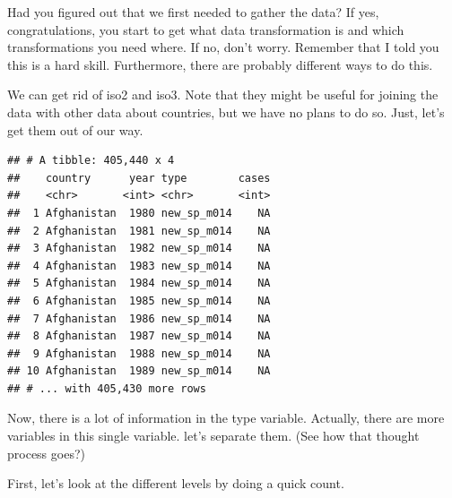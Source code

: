 \documentclass[]{tufte-book}
\newenvironment{Shaded}{}{}
\newcommand{\CommentTok}[1]{\textcolor[rgb]{0.38,0.63,0.69}{\textit{#1}}}
\newcommand{\DataTypeTok}[1]{\textcolor[rgb]{0.56,0.13,0.00}{#1}}
\newcommand{\KeywordTok}[1]{\textcolor[rgb]{0.00,0.44,0.13}{\textbf{#1}}}
\newcommand{\NormalTok}[1]{#1}
\newcommand{\OperatorTok}[1]{\textcolor[rgb]{0.40,0.40,0.40}{#1}}
\newcommand{\OtherTok}[1]{\textcolor[rgb]{0.00,0.44,0.13}{#1}}
\newcommand{\StringTok}[1]{\textcolor[rgb]{0.25,0.44,0.63}{#1}}
\begin{document}
Had you figured out that we first needed to gather the data? If yes, congratulations, you start to get what data transformation is and which transformations you need where. If no, don't worry. Remember that I told you this is a hard skill. Furthermore, there are probably different ways to do this.

We can get rid of iso2 and iso3. Note that they might be useful for joining the data with other data about countries, but we have no plans to do so. Just, let's get them out of our way.

\begin{Shaded}
\end{Shaded}

\begin{verbatim}
## # A tibble: 405,440 x 4
##    country      year type        cases
##    <chr>       <int> <chr>       <int>
##  1 Afghanistan  1980 new_sp_m014    NA
##  2 Afghanistan  1981 new_sp_m014    NA
##  3 Afghanistan  1982 new_sp_m014    NA
##  4 Afghanistan  1983 new_sp_m014    NA
##  5 Afghanistan  1984 new_sp_m014    NA
##  6 Afghanistan  1985 new_sp_m014    NA
##  7 Afghanistan  1986 new_sp_m014    NA
##  8 Afghanistan  1987 new_sp_m014    NA
##  9 Afghanistan  1988 new_sp_m014    NA
## 10 Afghanistan  1989 new_sp_m014    NA
## # ... with 405,430 more rows
\end{verbatim}

Now, there is a lot of information in the type variable. Actually, there are more variables in this single variable. let's separate them. (See how that thought process goes?)

First, let's look at the different levels by doing a quick count.

\begin{Shaded}
\end{Shaded}
\end{document}
